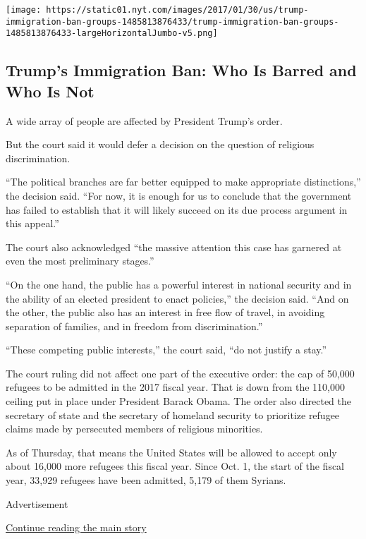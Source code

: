 \texttt{[image: https://static01.nyt.com/images/2017/01/30/us/trump-immigration-ban-groups-1485813876433/trump-immigration-ban-groups-1485813876433-largeHorizontalJumbo-v5.png]}

\hypertarget{trumps-immigration-ban-who-is-barred-and-who-is-not}{%
\subsection{Trump's Immigration Ban: Who Is Barred and Who Is
Not}\label{trumps-immigration-ban-who-is-barred-and-who-is-not}}

A wide array of people are affected by President Trump's order.

But the court said it would defer a decision on the question of
religious discrimination.

``The political branches are far better equipped to make appropriate
distinctions,'' the decision said. ``For now, it is enough for us to
conclude that the government has failed to establish that it will likely
succeed on its due process argument in this appeal.''

The court also acknowledged ``the massive attention this case has
garnered at even the most preliminary stages.''

``On the one hand, the public has a powerful interest in national
security and in the ability of an elected president to enact policies,''
the decision said. ``And on the other, the public also has an interest
in free flow of travel, in avoiding separation of families, and in
freedom from discrimination.''

``These competing public interests,'' the court said, ``do not justify a
stay.''

The court ruling did not affect one part of the executive order: the cap
of 50,000 refugees to be admitted in the 2017 fiscal year. That is down
from the 110,000 ceiling put in place under President Barack Obama. The
order also directed the secretary of state and the secretary of homeland
security to prioritize refugee claims made by persecuted members of
religious minorities.

As of Thursday, that means the United States will be allowed to accept
only about 16,000 more refugees this fiscal year. Since Oct. 1, the
start of the fiscal year, 33,929 refugees have been admitted, 5,179 of
them Syrians.

Advertisement

\protect\hyperlink{after-bottom}{Continue reading the main story}

